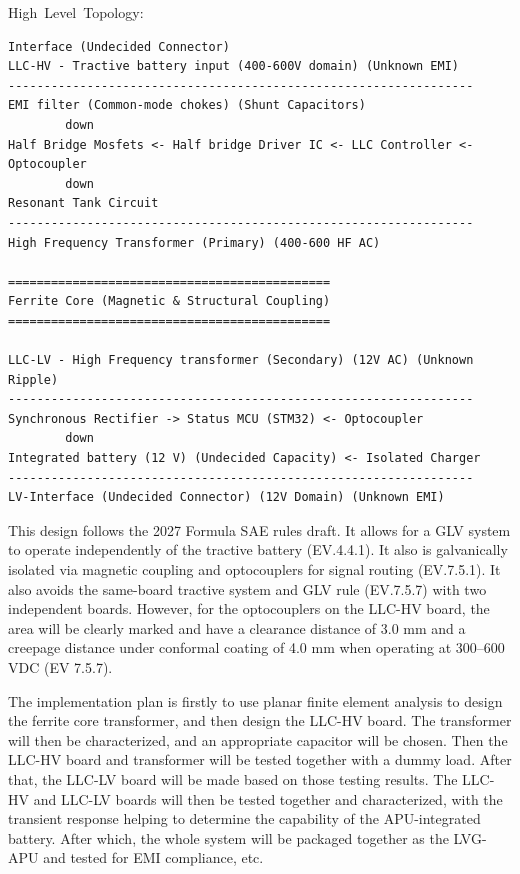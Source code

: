 \documentclass[12pt,a4paper]{article}
\begin{document}
\vspace{0.5cm}

\hbox{\large{High Level Topology:}}
\begin{lstlisting}
Interface (Undecided Connector) 
LLC-HV - Tractive battery input (400-600V domain) (Unknown EMI)
-----------------------------------------------------------------
EMI filter (Common-mode chokes) (Shunt Capacitors)
        down
Half Bridge Mosfets <- Half bridge Driver IC <- LLC Controller <- Optocoupler
        down
Resonant Tank Circuit
-----------------------------------------------------------------
High Frequency Transformer (Primary) (400-600 HF AC)

=============================================
Ferrite Core (Magnetic & Structural Coupling)
=============================================

LLC-LV - High Frequency transformer (Secondary) (12V AC) (Unknown Ripple)
-----------------------------------------------------------------
Synchronous Rectifier -> Status MCU (STM32) <- Optocoupler
        down
Integrated battery (12 V) (Undecided Capacity) <- Isolated Charger
-----------------------------------------------------------------
LV-Interface (Undecided Connector) (12V Domain) (Unknown EMI)
\end{lstlisting}

\vspace{0.5cm}

This design follows the 2027 Formula SAE rules draft. It allows for a GLV system to operate independently of the tractive battery (EV.4.4.1). It also
is galvanically isolated via magnetic coupling and optocouplers for signal routing (EV.7.5.1). It also avoids the same-board tractive system and GLV rule (EV.7.5.7) 
with two independent boards. However, for the optocouplers on the LLC-HV board, the area will be clearly marked and have a clearance distance of 3.0 mm and a creepage distance under
conformal coating of 4.0 mm when operating at 300--600 VDC (EV 7.5.7).

\vspace{0.5cm}

The implementation plan is firstly to use planar finite element analysis to design the ferrite core transformer, and then design the LLC-HV board. The transformer will then be characterized,
and an appropriate capacitor will be chosen. Then the LLC-HV board and transformer will be tested together with a dummy load. After that, the LLC-LV board will be made based on those testing
results. The LLC-HV and LLC-LV boards will then be tested together and characterized, with the transient response helping to determine the capability of the APU-integrated battery. After which,
the whole system will be packaged together as the LVG-APU and tested for EMI compliance, etc.
\end{document}
